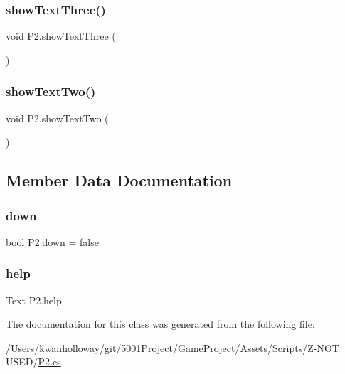\mbox{\label{class_p2_a780ca00a71e17fbe6e5047bdb11c90a4}} 
\subsubsection{\texorpdfstring{show\+Text\+Three()}{showTextThree()}}
{\footnotesize\ttfamily void P2.\+show\+Text\+Three (\begin{DoxyParamCaption}{ }\end{DoxyParamCaption})}

\mbox{\label{class_p2_a152ef7f6e9de4265caf63cf2a1f70822}} 
\subsubsection{\texorpdfstring{show\+Text\+Two()}{showTextTwo()}}
{\footnotesize\ttfamily void P2.\+show\+Text\+Two (\begin{DoxyParamCaption}{ }\end{DoxyParamCaption})}



\subsection{Member Data Documentation}
\mbox{\label{class_p2_a78207b72f4528ec324966d7aaa3f8dc9}} 
\subsubsection{\texorpdfstring{down}{down}}
{\footnotesize\ttfamily bool P2.\+down = false}

\mbox{\label{class_p2_a2a27095e4b32343150d613a13fa0408a}} 
\subsubsection{\texorpdfstring{help}{help}}
{\footnotesize\ttfamily Text P2.\+help}



The documentation for this class was generated from the following file\+:\begin{DoxyCompactItemize}
\item 
/\+Users/kwanholloway/git/5001\+Project/\+Game\+Project/\+Assets/\+Scripts/\+Z-\/\+N\+O\+T U\+S\+E\+D/\hyperlink{_p2_8cs}{P2.\+cs}\end{DoxyCompactItemize}
